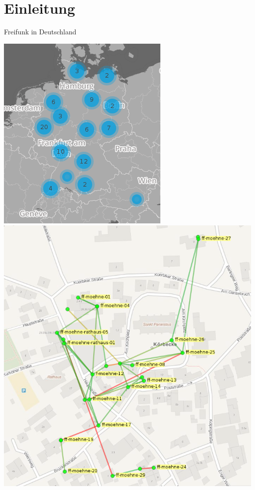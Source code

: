 \documentclass{beamer}
\begin{document}
\section{Einleitung}
\begin{frame}{Freifunk in Deutschland}
\vfill
\begin{center}
\includegraphics[height=0.6\textheight]{images/map}$\;$
\includegraphics[height=0.6\textheight]{images/moehne}
\end{center}
\vfill
\end{frame}
\end{document}
